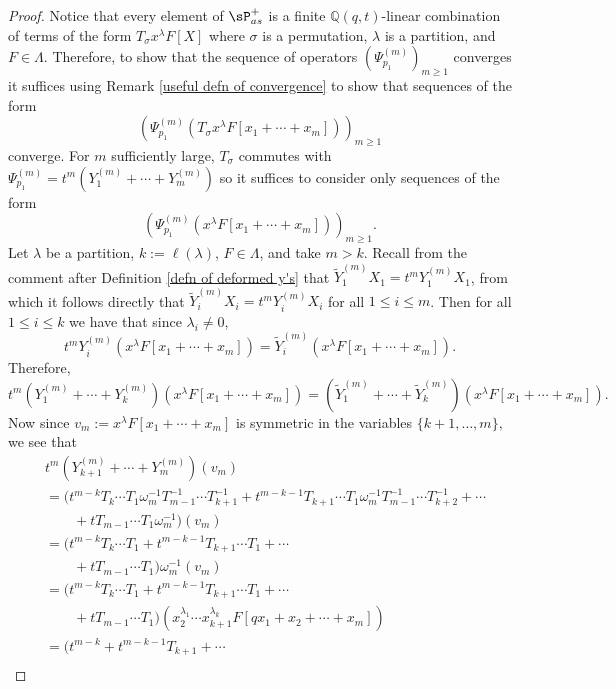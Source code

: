 \begin{proof}
    Notice that every element of $\sP_{as}^{+}$ is a finite $\mathbb{Q}(q,t)$-linear combination of terms of the form $T_{\sigma}x^{\lambda}F[X]$ where $\sigma$ is a permutation, $\lambda$ is a partition, and $F\in \Lambda$. Therefore, to show that the sequence of operators $(\Psi_{p_1}^{(m)})_{m\geq 1}$ converges it suffices using Remark \ref{useful defn of convergence} to show that sequences of the form 
    $$(\Psi_{p_1}^{(m)}(T_{\sigma}x^{\lambda}F[x_1+ \cdots +x_m]))_{m \geq 1} $$ converge. For $m$ sufficiently large, $T_{\sigma}$ commutes with $\Psi_{p_1}^{(m)} = t^m(Y_{1}^{(m)}+ \cdots + Y_{m}^{(m)})$ so it suffices to consider only sequences of the form $$(\Psi_{p_1}^{(m)}(x^{\lambda}F[x_1+ \cdots +x_m])) _{m \geq 1} .$$ Let $\lambda$ be a partition, $k := \ell(\lambda)$, $F\in \Lambda$, and take $m > k$. Recall from the comment after Definition \ref{defn of deformed y's} that $\widetilde{Y}_1^{(m)}X_1 = t^mY_{1}^{(m)}X_1$, from which it follows directly that $\widetilde{Y}_i^{(m)}X_i = t^mY_{i}^{(m)}X_i$ for all $1 \leq i \leq m$. Then for all $1\leq i \leq k$ we have that since $\lambda_i \neq 0$, 
    $$t^mY_i^{(m)}(x^{\lambda}F[x_1+\cdots+x_m]) = \widetilde{Y}_{i}^{(m)}(x^{\lambda}F[x_1+\cdots+x_m]).$$
    Therefore, 
    $$t^m(Y_1^{(m)}+ \cdots +Y_k^{(m)})(x^{\lambda}F[x_1+ \cdots +x_m]) = (\widetilde{Y}_{1}^{(m)}+ \cdots + \widetilde{Y}_{k}^{(m)})(x^{\lambda}F[x_1+ \cdots +x_m]).$$
    Now since $v_m:=x^{\lambda}F[x_1+\cdots+x_m]$ is symmetric in the variables $\{k+1,\ldots,m\},$ we see that     
    \begin{align*}
        &t^m(Y_{k+1}^{(m)}+ \cdots + Y_{m}^{(m)})(v_m) \\
        &= (t^{m-k}T_{k}\cdots T_1 \omega_m^{-1}T_{m-1}^{-1}\cdots T_{k+1}^{-1} + t^{m-k-1}T_{k+1}\cdots T_1 \omega^{-1}_{m}T_{m-1}^{-1}\cdots T_{k+2}^{-1} + \cdots \\
          & \qquad + tT_{m-1}\cdots T_1 \omega_{m}^{-1})(v_m) \\
        &= (t^{m-k}T_{k}\cdots T_1 + t^{m-k-1}T_{k+1}\cdots T_1 + \cdots \\
          & \qquad + tT_{m-1}\cdots T_1)\omega_m^{-1}(v_m) \\
        &= (t^{m-k}T_{k}\cdots T_1 + t^{m-k-1}T_{k+1}\cdots T_1 + \cdots \\
          & \qquad + tT_{m-1}\cdots T_1)(x_2^{\lambda_1}\cdots x_{k+1}^{\lambda_{k}}F[qx_1+x_2+ \cdots + x_m])\\
        &= (t^{m-k}+t^{m-k-1}T_{k+1}+ \cdots \\

\end{align*}
\end{proof}

